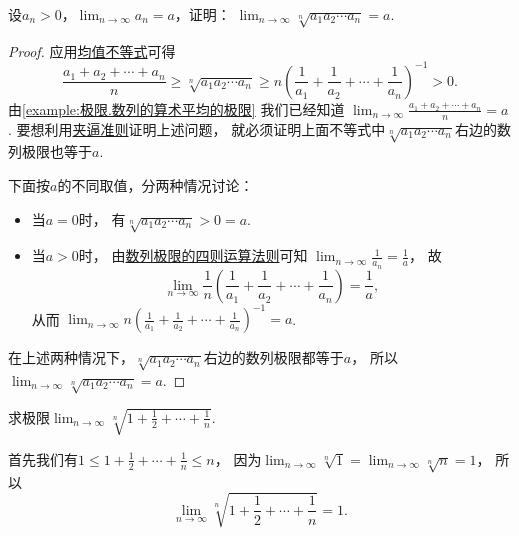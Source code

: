 \begin{example}\label{example:极限.收敛数列前n项积的n次方根}
设\(a_n>0\)，\(\lim_{n\to\infty} a_n = a\)，证明：
\(\lim_{n\to\infty} \sqrt[n]{a_1 a_2 \dotsm a_n} = a\).
\begin{proof}
应用\hyperref[theorem:不等式.均值不等式]{均值不等式}可得\begin{equation*}
	\frac{a_1+a_2+\dotsb+a_n}n
	\geq \sqrt[n]{a_1 a_2 \dotsm a_n}
	\geq n\left(\frac1{a_1}+\frac1{a_2}+\dotsb+\frac1{a_n}\right)^{-1}
	> 0.
\end{equation*}
由\cref{example:极限.数列的算术平均的极限} 我们已经知道
\(\lim_{n\to\infty} \frac{a_1+a_2+\dotsb+a_n}{n} = a\).
要想利用\hyperref[theorem:数列极限.夹逼准则]{夹逼准则}证明上述问题，
就必须证明上面不等式中\(\sqrt[n]{a_1 a_2 \dotsm a_n}\)右边的数列极限也等于\(a\).

下面按\(a\)的不同取值，分两种情况讨论：
\begin{itemize}
	\item 当\(a=0\)时，
	有\(\sqrt[n]{a_1 a_2 \dotsm a_n} > 0 = a\).

	\item 当\(a>0\)时，
	由\hyperref[theorem:极限.数列极限的四则运算法则]{数列极限的四则运算法则}可知
	\(\lim_{n\to\infty} \frac1{a_n} = \frac1a\)，
	故\begin{equation*}
		\lim_{n\to\infty} \frac1n \left(\frac1{a_1}+\frac1{a_2}+\dotsb+\frac1{a_n}\right) = \frac1a,
	\end{equation*}
	从而
	\(\lim_{n\to\infty} n\left(\frac1{a_1}+\frac1{a_2}+\dotsb+\frac1{a_n}\right)^{-1} = a\).
\end{itemize}
在上述两种情况下，\(\sqrt[n]{a_1 a_2 \dotsm a_n}\)右边的数列极限都等于\(a\)，
所以\(\lim_{n\to\infty} \sqrt[n]{a_1 a_2 \dotsm a_n} = a\).
\end{proof}
\end{example}

\begin{example}
求极限\(\lim_{n\to\infty} \sqrt[n]{1+\frac12+\dotsb+\frac1n}\).
\begin{solution}
首先我们有\(1 \leq 1+\frac12+\dotsb+\frac1n \leq n\)，
因为\(\lim_{n\to\infty} \sqrt[n]{1} = \lim_{n\to\infty} \sqrt[n]{n} = 1\)，
所以\begin{equation*}
	\lim_{n\to\infty} \sqrt[n]{1+\frac12+\dotsb+\frac1n} = 1.
\end{equation*}
\end{solution}
\end{example}

